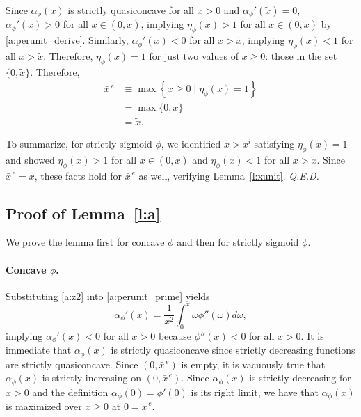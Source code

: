 \documentclass[12pt]{article}
\renewcommand{\qed}{{\it Q.E.D.}}
\newcommand{\efficacy}{\phi}
\newcommand{\xunitbar}{\bar{x}^{\,e}}
\newcommand{\xpoi}{x^{i}}
\newcommand{\elasticity}[1]{\eta_{#1}}
\newcommand{\perunit}[1]{\alpha_{#1}}
\newcommand{\xtilde}{\tilde{x}}
\begin{document}
Since $\perunit{\efficacy}\!(x)$ is strictly quasiconcave for all $x >
0$ and $\perunit{\efficacy}'\!(\xtilde) = 0$,
$\perunit{\efficacy}'\!(x) > 0$ for all $x \in (0, \xtilde)$, implying
$\elasticity{\efficacy}\!(x) > 1$ for all $x \in (0, \xtilde)$ by
\eqref{a:perunit_derive}. Similarly, $\perunit{\efficacy}'\!(x) < 0$
for all $x > \xtilde$, implying $\elasticity{\efficacy}\!(x) < 1$ for
all $x > \xtilde$. Therefore, $\elasticity{\efficacy}\!(x) = 1$ for
just two values of $x \geq 0$: those in the set $\{0,
\xtilde\}$. Therefore,
\begin{align}
\xunitbar & \equiv \max \left\{ x \geq 0 \mid \elasticity{\efficacy}\!(x) = 1 \right\} \label{a:xunit1} \\
& = \max \{0, \xtilde \} \label{a:xunit2} \\
& = \xtilde.
\end{align}

To summarize, for strictly sigmoid $\efficacy$, we identified $\xtilde
> \xpoi$ satisfying $\elasticity{\efficacy}\!(\xtilde) = 1$ and showed
$\elasticity{\efficacy}\!(x) > 1$ for all $x \in (0, \xtilde)$ and
$\elasticity{\efficacy}\!(x) < 1$ for all $x > \xtilde$. Since
$\xunitbar = \xtilde$, these facts hold for $\xunitbar$ as well,
verifying Lemma~\ref{l:xunit}. \qed


\subsection*{Proof of Lemma~\ref{l:a}}

We prove the lemma first for concave $\efficacy$ and then for strictly
sigmoid $\efficacy$.

\paragraph{Concave $\efficacy$.} 

Substituting \eqref{a:z2} into \eqref{a:perunit_prime} yields
\begin{equation}
\label{a:aquasiconcave_concave}
\perunit{\efficacy}'\!(x) =\frac{1}{x^2} \int_0^x \omega
\efficacy''(\omega) d\omega,
\end{equation}
implying $\perunit{\efficacy}'\!(x) < 0$ for all $x > 0$ because
$\efficacy''(x) < 0$ for all $x > 0$. It is immediate that
$\perunit{\efficacy}\!(x)$ is strictly quasiconcave since strictly
decreasing functions are strictly quasiconcave. Since $(0,\xunitbar)$
is empty, it is vacuously true that $\perunit{\efficacy}\!(x)$ is
strictly increasing on $(0,\xunitbar)$.  Since
$\perunit{\efficacy}\!(x)$ is strictly decreasing for $x > 0$ and the
definition $\perunit{\efficacy}\!(0) = \efficacy'(0)$ is its right
limit, we have that $\perunit{\efficacy}\!(x)$ is maximized over $x
\geq 0$ at $0 = \xunitbar$.
\end{document}

